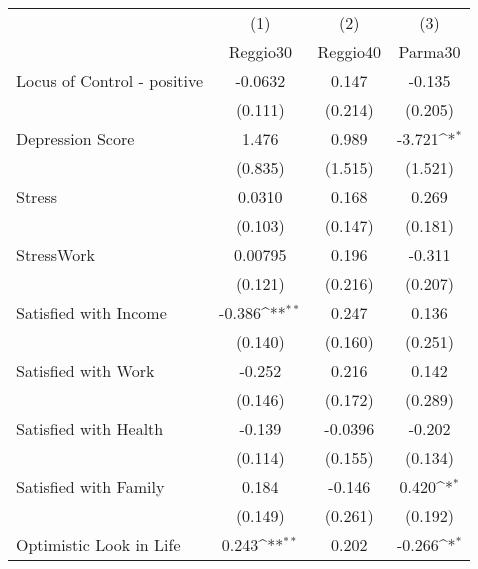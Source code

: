{
\def\sym#1{\ifmmode^{#1}\else\(^{#1}\)\fi}
\begin{tabular}{l*{3}{c}}
\toprule
            &\multicolumn{1}{c}{(1)}&\multicolumn{1}{c}{(2)}&\multicolumn{1}{c}{(3)}\\
            &\multicolumn{1}{c}{Reggio30}&\multicolumn{1}{c}{Reggio40}&\multicolumn{1}{c}{Parma30}\\
\midrule
Locus of Control - positive&     -0.0632         &       0.147         &      -0.135         \\
            &     (0.111)         &     (0.214)         &     (0.205)         \\
\addlinespace
Depression Score&       1.476         &       0.989         &      -3.721\sym{*}  \\
            &     (0.835)         &     (1.515)         &     (1.521)         \\
\addlinespace
Stress      &      0.0310         &       0.168         &       0.269         \\
            &     (0.103)         &     (0.147)         &     (0.181)         \\
\addlinespace
StressWork  &     0.00795         &       0.196         &      -0.311         \\
            &     (0.121)         &     (0.216)         &     (0.207)         \\
\addlinespace
Satisfied with Income&      -0.386\sym{**} &       0.247         &       0.136         \\
            &     (0.140)         &     (0.160)         &     (0.251)         \\
\addlinespace
Satisfied with Work&      -0.252         &       0.216         &       0.142         \\
            &     (0.146)         &     (0.172)         &     (0.289)         \\
\addlinespace
Satisfied with Health&      -0.139         &     -0.0396         &      -0.202         \\
            &     (0.114)         &     (0.155)         &     (0.134)         \\
\addlinespace
Satisfied with Family&       0.184         &      -0.146         &       0.420\sym{*}  \\
            &     (0.149)         &     (0.261)         &     (0.192)         \\
\addlinespace
Optimistic Look in Life&       0.243\sym{**} &       0.202         &      -0.266\sym{*}  \\

\end{tabular}}
